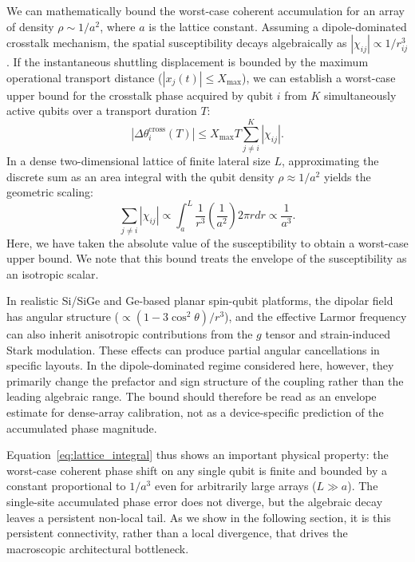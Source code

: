 \documentclass[a4paper,twocolumn,11pt]{quantumarticle}
\begin{document}
We can mathematically bound the worst-case coherent accumulation for an array of density $\rho \sim 1/a^2$, where $a$ is the lattice constant. Assuming a dipole-dominated crosstalk mechanism, the spatial susceptibility decays algebraically as $|\chi_{ij}| \propto 1/r_{ij}^3$. If the instantaneous shuttling displacement is bounded by the maximum operational transport distance ($|x_j(t)| \le X_{\max}$), we can establish a worst-case upper bound for the crosstalk phase acquired by qubit $i$ from $K$ simultaneously active qubits over a transport duration $T$:
\begin{equation}
    |\Delta\theta_i^{\text{cross}}(T)| \le X_{\max} T \sum_{j \neq i}^K |\chi_{ij}|.
    \label{eq:accumulation_bound}
\end{equation}
In a dense two-dimensional lattice of finite lateral size $L$, approximating the discrete sum as an area integral with the qubit density $\rho \approx 1/a^2$ yields the geometric scaling:
\begin{equation}
    \sum_{j \neq i} |\chi_{ij}| \propto \int_a^L \frac{1}{r^3} \left(\frac{1}{a^2}\right) 2\pi r dr \propto \frac{1}{a^3}.
    \label{eq:lattice_integral}
\end{equation}
Here, we have taken the absolute value of the susceptibility to obtain a worst-case upper bound. We note that this bound treats the envelope of the susceptibility as an isotropic scalar.

In realistic Si/SiGe and Ge-based planar spin-qubit platforms, the dipolar field has angular structure ($\propto (1-3\cos^2\theta)/r^3$), and the effective Larmor frequency can also inherit anisotropic contributions from the $g$ tensor and strain-induced Stark modulation. These effects can produce partial angular cancellations in specific layouts. In the dipole-dominated regime considered here, however, they primarily change the prefactor and sign structure of the coupling rather than the leading algebraic range. The bound should therefore be read as an envelope estimate for dense-array calibration, not as a device-specific prediction of the accumulated phase magnitude.

Equation~\eqref{eq:lattice_integral} thus shows an important physical property: the worst-case coherent phase shift on any single qubit is finite and bounded by a constant proportional to $1/a^3$ even for arbitrarily large arrays ($L \gg a$). The single-site accumulated phase error does not diverge, but the algebraic decay leaves a persistent non-local tail. As we show in the following section, it is this persistent connectivity, rather than a local divergence, that drives the macroscopic architectural bottleneck.
\end{document}
